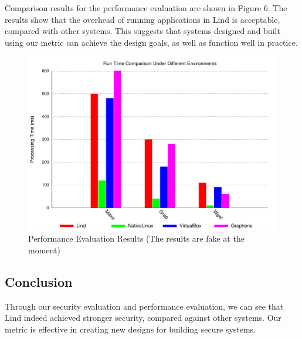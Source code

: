 Comparison results for the performance evaluation are shown in Figure 6.
The results show that the overhead of running applications in Lind is acceptable, compared with other systems. 
This suggests that systems designed and built using our metric can achieve the design goals, as well as function well in practice. 

\begin{figure}[h]
\centering
\includegraphics[width=1.0\columnwidth]{diagram/lind_ccs15_diagram_05.pdf}
\caption{Performance Evaluation Results {\color{red}(The results are fake at the moment)}}
\label{fig:performance_evaluation_results}
\end{figure}

\subsection{Conclusion}
Through our security evaluation and performance evaluation, we can see that 
Lind indeed achieved stronger security, compared against other systems.
Our metric is effective in creating new designs for building secure systems. 

